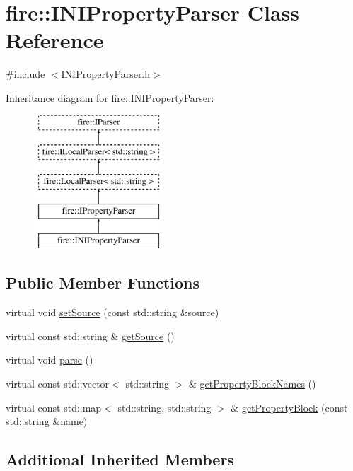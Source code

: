 \hypertarget{a00020}{}\section{fire\+:\+:I\+N\+I\+Property\+Parser Class Reference}
\label{a00020}


{\ttfamily \#include $<$I\+N\+I\+Property\+Parser.\+h$>$}

Inheritance diagram for fire\+:\+:I\+N\+I\+Property\+Parser\+:\begin{figure}[H]
\begin{center}
\leavevmode
\includegraphics[height=5.000000cm]{a00020}
\end{center}
\end{figure}
\subsection*{Public Member Functions}
\begin{DoxyCompactItemize}
\item 
virtual void \hyperlink{a00020_a06793909bc707a69d0c5772b14bc946d}{set\+Source} (const std\+::string \&source)
\item 
virtual const std\+::string \& \hyperlink{a00020_ad02c9a530f20a706d7bb2554813e8d3a}{get\+Source} ()
\item 
virtual void \hyperlink{a00020_a31b6bad01e65ed4bb5f1ba297616c641}{parse} ()
\item 
virtual const std\+::vector$<$ std\+::string $>$ \& \hyperlink{a00020_aed0f1f47111794659564dcddb4d25bc6}{get\+Property\+Block\+Names} ()
\item 
virtual const std\+::map$<$ std\+::string, std\+::string $>$ \& \hyperlink{a00020_a3591312590a66659ebd377cdde9ab9ad}{get\+Property\+Block} (const std\+::string \&name)
\end{DoxyCompactItemize}
\subsection*{Additional Inherited Members}


